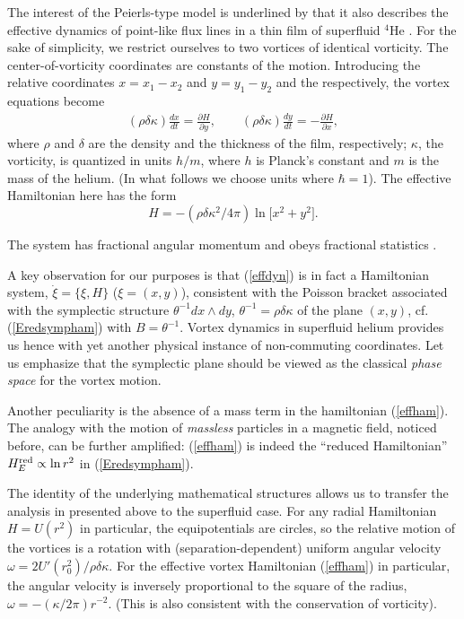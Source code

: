 \documentclass[a4paper,11pt]{article}
\def\p{{\partial}}
\begin{document}
The  interest of the Peierls-type
model is underlined by that it also describes the
effective dynamics of point-like flux lines in a thin film of
superfluid ${}^4$He \cite{HMC, LeMy}.
For the sake of simplicity, we restrict ourselves to  two
vortices of identical vorticity.
The center-of-vorticity coordinates are constants of the motion.
Introducing the relative coordinates
$x=x_{1}-x_{2}$ and $y=y_{1}-y_{2}$ and the respectively,
the vortex equations become \cite{HMC}
\begin{eqnarray}
     (\rho\delta\kappa)\frac{dx}{dt}=\frac{\p H}{\p y},
     \qquad
     (\rho\delta\kappa)\frac{dy}{dt}=-\frac{\p H}{\p x},
      \label{effdyn}
\end{eqnarray}
where $\rho$ and $\delta$ are the density and the thickness of the
film, respectively;
$\kappa$, the vorticity,  is quantized in units
  $h/m$, where $h$ is Planck's
constant and $m$ is the mass of the helium. (In what follows we choose
units where $\hbar=1$). The effective Hamiltonian here has the form
\begin{equation}
H=-(\rho\delta\kappa^2/4\pi)\ln\big[x^2+y^2\big].
\label{effham}
\end{equation}

The system has fractional angular momentum and
  obeys fractional statistics \cite{HMC, LeMy}.

A key observation for our purposes \cite{LeMy} is that
(\ref{effdyn}) is in fact a Hamiltonian system, $\dot{\xi}=\{\xi,H\}$
($\xi=(x,y)$),
consistent with
the Poisson bracket associated with the symplectic structure
  $\theta^{-1}dx\wedge dy$, $\theta^{-1}=\rho\delta\kappa$
of the plane $(x,y)$, cf.
(\ref{Eredsympham}) with $B=\theta^{-1}$.
Vortex dynamics in superfluid helium provides us hence
with yet another physical instance of non-commuting coordinates.
Let us emphasize that the symplectic plane should be viewed as
the classical {\it phase space} for the vortex motion.

\goodbreak
Another peculiarity is the absence of a mass term in the hamiltonian
(\ref{effham}).
The analogy with the motion of {\it massless} particles in a
magnetic field, noticed \cite{HMC, LeMy} before,
can be further amplified:  (\ref{effham}) is indeed the ``reduced
Hamiltonian''  $H^{\rm red}_{E}\propto\ln r^2$ in (\ref{Eredsympham}).

The identity of the underlying mathematical structures
allows us to transfer the analysis in presented above to the
superfluid case.
For any radial Hamiltonian $H=U(r^2)$ in particular,
the equipotentials are circles, so the relative motion of the
vortices is a rotation
with (separation-dependent) uniform angular velocity
$\omega=2U'(r_{0}^2)/\rho\delta\kappa$.
For the effective vortex Hamiltonian (\ref{effham}) in particular,
the angular velocity is inversely proportional to the square of the radius,
$\omega=-(\kappa/2\pi)r^{-2}$. (This is also consistent with the
conservation of vorticity).
\end{document}
